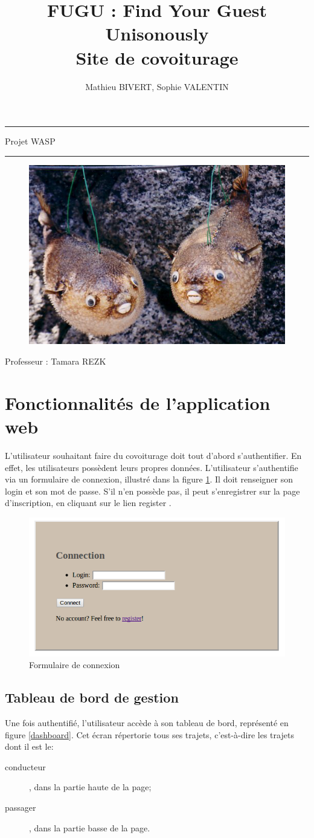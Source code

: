 \documentclass[a4paper]{article}
\title{FUGU : Find Your Guest Unisonously\\Site de covoiturage}
\author{Mathieu BIVERT, Sophie VALENTIN}
\makeatletter
\def\maketitle{%
  \null
  \thispagestyle{empty}%
  \vskip 1cm
  \begin{center}
        \normalfont\large\huge\@author
  \end{center}
  \vfil
  \vfil
  \vfil
  \vfil
  \vfil
  \vfil
  \vfil
  \vfil
  \vfil
  \vfil
  \vfil
  \vfil  
  \vfil  
  \hrule height 2pt
  \par
  \begin{center}
        \huge \strut Projet WASP\\
        \@title \par
  \end{center}
  \hrule height 2pt
  \par
  \vfil
  \vfil
  \vfil
  \vfil
  \vfil
  \vfil
  \vfil
  \begin{figure}[!ht]
  	\centering
  	\includegraphics[scale=1]{imgs/fugu.png}
  \end{figure}
  \vfil
  \vfil
  \vfil
  \vfil  
  \vfil  
  \vfil
  \vfil  
  \vfil  
  \vfil
  \vfil
  \vfil
  \vfil
  \vfil
  \vfil
  \begin{center}
  			\huge Professeur : Tamara REZK
  \end{center}
  \null
\cleardoublepage
}
\makeatother
\begin{document}
\maketitle

\newpage

\section{Fonctionnalités de l'application web}

L'utilisateur souhaitant faire du covoiturage doit tout d'abord s'authentifier.
En effet, les utilisateurs possèdent leurs propres données.
L'utilisateur s'authentifie via un formulaire de connexion, illustré dans la
figure \ref{login}. Il doit renseigner son login et son mot de passe.
S'il n'en possède pas, il peut s'enregistrer sur la page d'inscription, en cliquant
sur le lien \og register \fg.

\begin{figure}[!ht]
	\centering
	\includegraphics[scale=0.4]{Connexion.png}
	\caption{\label{login} Formulaire de connexion}
\end{figure}

\subsection{Tableau de bord de gestion}

Une fois authentifié, l'utilisateur accède à son tableau de bord, représenté en
figure \ref{dashboard}. Cet écran répertorie tous ses trajets, c'est-à-dire les
trajets dont il est le:
\begin{description}
	\item[conducteur], dans la partie haute de la page;
	\item[passager], dans la partie basse de la page.
\end{description}
\end{document}
